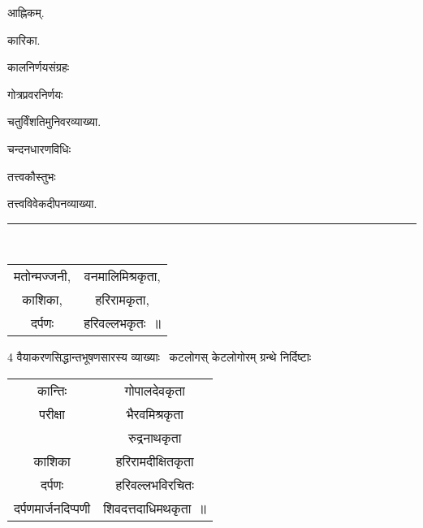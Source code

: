 \documentclass[11pt, openany]{book}
\makeatletter
\newcommand{\devanagarinumeral}[1]{
\devanagaridigits{\number \csname c@#1\endcsname}} %
\makeatother
\begin{document}
\begin{multicols}{2}
आह्निकम्. 

कारिका. 

कालनिर्णयसंग्रहः 

गोत्रप्रवरनिर्णयः 

चतुर्विंशतिमुनिवरव्याख्या. 

चन्दनधारणविधिः 

तत्त्वकौस्तुभः 

तत्त्वविवेकदीपनव्याख्या. 

\noindent
\rule{1\linewidth}{0.5pt}\\

\begin{tabular}{c c}
मतोन्मज्जनी,& वनमालिमिश्रकृता, \\
काशिका, & हरिरामकृता, \\
दर्पणः & हरिवल्लभकृतः~॥ 
\end{tabular}

4 वैयाकरणसिद्धान्तभूषणसारस्य व्याख्याः \textendash\ कटलोगस् केटलोगोरम् ग्रन्थे निर्दिष्टाः \textendash\ 

\begin{tabular}{c c}
कान्तिः & गोपालदेवकृता \\
परीक्षा & भैरवमिश्रकृता \\
& रुद्रनाथकृता \\
काशिका & हरिरामदीक्षितकृता \\
दर्पणः & हरिवल्लभविरचितः \\
दर्पणमार्जनदिप्पणी & शिवदत्तदाधिमथकृता~॥
\end{tabular}
\end{multicols}

\fancyhead[RO,LE]{\thepage}
\cfoot{}
\newpage
\renewcommand{\thepage}{\devanagarinumeral{page}}
\setcounter{page}{22}
\end{document}
